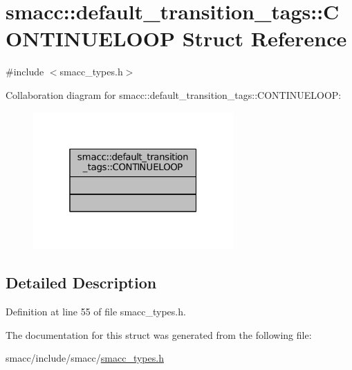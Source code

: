\hypertarget{structsmacc_1_1default__transition__tags_1_1CONTINUELOOP}{}\section{smacc\+:\+:default\+\_\+transition\+\_\+tags\+:\+:C\+O\+N\+T\+I\+N\+U\+E\+L\+O\+OP Struct Reference}
\label{structsmacc_1_1default__transition__tags_1_1CONTINUELOOP}


{\ttfamily \#include $<$smacc\+\_\+types.\+h$>$}



Collaboration diagram for smacc\+:\+:default\+\_\+transition\+\_\+tags\+:\+:C\+O\+N\+T\+I\+N\+U\+E\+L\+O\+OP\+:
\nopagebreak
\begin{figure}[H]
\begin{center}
\leavevmode
\includegraphics[width=217pt]{structsmacc_1_1default__transition__tags_1_1CONTINUELOOP__coll__graph}
\end{center}
\end{figure}


\subsection{Detailed Description}


Definition at line 55 of file smacc\+\_\+types.\+h.



The documentation for this struct was generated from the following file\+:\begin{DoxyCompactItemize}
\item 
smacc/include/smacc/\hyperlink{smacc__types_8h}{smacc\+\_\+types.\+h}\end{DoxyCompactItemize}
